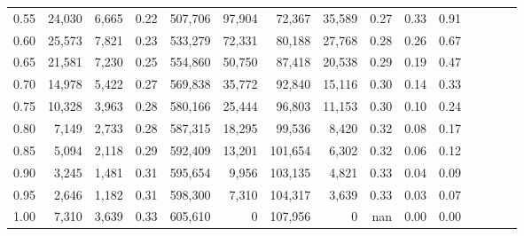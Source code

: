 \begin{tabular}{rrrcrrrrrrrrrrr}
0.55 &  24,030 &  6,665 &                                       0.22 &  507,706 &   97,904 &   72,367 &   35,589 &  0.27 &  0.33 &                         0.91 \\
0.60 &  25,573 &  7,821 &                                       0.23 &  533,279 &   72,331 &   80,188 &   27,768 &  0.28 &  0.26 &                         0.67 \\
0.65 &  21,581 &  7,230 &                                       0.25 &  554,860 &   50,750 &   87,418 &   20,538 &  0.29 &  0.19 &                         0.47 \\
0.70 &  14,978 &  5,422 &                                       0.27 &  569,838 &   35,772 &   92,840 &   15,116 &  0.30 &  0.14 &                         0.33 \\
0.75 &  10,328 &  3,963 &                                       0.28 &  580,166 &   25,444 &   96,803 &   11,153 &  0.30 &  0.10 &                         0.24 \\
0.80 &   7,149 &  2,733 &                                       0.28 &  587,315 &   18,295 &   99,536 &    8,420 &  0.32 &  0.08 &                         0.17 \\
0.85 &   5,094 &  2,118 &                                       0.29 &  592,409 &   13,201 &  101,654 &    6,302 &  0.32 &  0.06 &                         0.12 \\
0.90 &   3,245 &  1,481 &                                       0.31 &  595,654 &    9,956 &  103,135 &    4,821 &  0.33 &  0.04 &                         0.09 \\
0.95 &   2,646 &  1,182 &                                       0.31 &  598,300 &    7,310 &  104,317 &    3,639 &  0.33 &  0.03 &                         0.07 \\
1.00 &   7,310 &  3,639 &                                       0.33 &  605,610 &        0 &  107,956 &        0 &   nan &  0.00 &                         0.00 \\
\bottomrule
\end{tabular}
